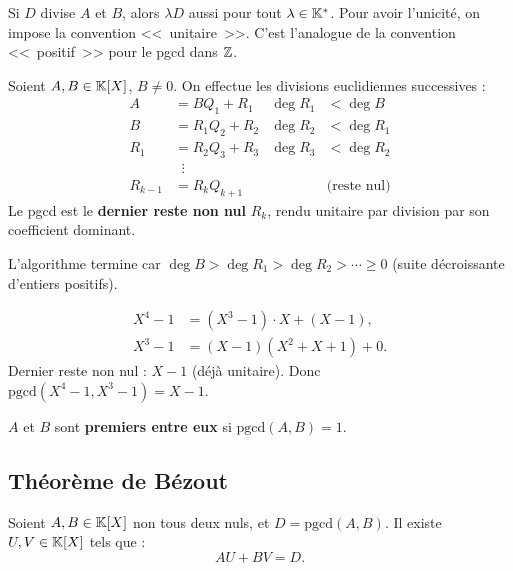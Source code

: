 \begin{rembox}
Si $D$ divise $A$ et $B$, alors $\lambda D$ aussi pour tout $\lambda \in \mathbb{K}^*$. Pour avoir l'unicité, on impose la convention <<~unitaire~>>. C'est l'analogue de la convention <<~positif~>> pour le pgcd dans $\mathbb{Z}$.
\end{rembox}

\begin{methodbox}
Soient $A, B \in \mathbb{K}[X]$, $B \neq 0$. On effectue les divisions euclidiennes successives :
\begin{align*}
  A &= B Q_1 + R_1 & \deg R_1 &< \deg B \\
  B &= R_1 Q_2 + R_2 & \deg R_2 &< \deg R_1 \\
  R_1 &= R_2 Q_3 + R_3 & \deg R_3 &< \deg R_2 \\
  &\;\;\vdots \\
  R_{k-1} &= R_k Q_{k+1} & &\text{(reste nul)}
\end{align*}
Le pgcd est le \textbf{dernier reste non nul} $R_k$, rendu unitaire par division par son coefficient dominant.

L'algorithme termine car $\deg B > \deg R_1 > \deg R_2 > \cdots \geqslant 0$ (suite décroissante d'entiers positifs).
\end{methodbox}

\begin{exbox}
\begin{align*}
  X^4 - 1 &= (X^3 - 1) \cdot X + (X - 1), \\
  X^3 - 1 &= (X - 1)(X^2 + X + 1) + 0.
\end{align*}
Dernier reste non nul : $X - 1$ (déjà unitaire). Donc $\text{pgcd}(X^4 - 1, X^3 - 1) = X - 1$.
\end{exbox}

\begin{defbox}
$A$ et $B$ sont \textbf{premiers entre eux} si $\text{pgcd}(A, B) = 1$.
\end{defbox}

\subsection{Théorème de Bézout}

\begin{thmbox}
Soient $A, B \in \mathbb{K}[X]$ non tous deux nuls, et $D = \text{pgcd}(A, B)$. Il existe $U, V \in \mathbb{K}[X]$ tels que :
\[
  A U + B V = D.
\]
\end{thmbox}

